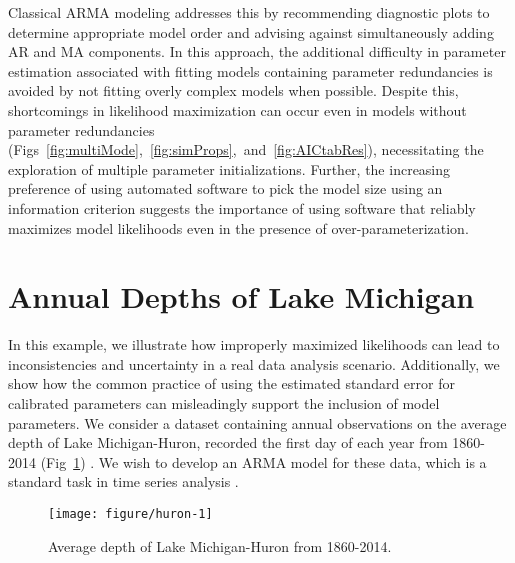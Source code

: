 Classical ARMA modeling addresses this by recommending diagnostic plots to determine appropriate model order and advising against simultaneously adding AR and MA components.
In this approach, the additional difficulty in parameter estimation associated with fitting models containing parameter redundancies is avoided by not fitting overly complex models when possible.
Despite this, shortcomings in likelihood maximization can occur even in models without parameter redundancies (Figs~\ref{fig:multiMode},~\ref{fig:simProps},~and~\ref{fig:AICtabRes}), necessitating the exploration of multiple parameter initializations.
Further, the increasing preference of using automated software to pick the model size using an information criterion suggests the importance of using software that reliably maximizes model likelihoods even in the presence of over-parameterization. 

\section{Annual Depths of Lake Michigan}\label{sec:depths}

\noindent In this example, we illustrate how improperly maximized likelihoods can lead to inconsistencies and uncertainty in a real data analysis scenario.
Additionally, we show how the common practice of using the estimated standard error for calibrated parameters can misleadingly support the inclusion of model parameters.
We consider a dataset containing annual observations on the average depth of Lake Michigan-Huron, recorded the first day of each year from 1860-2014 (Fig~\ref{fig:huron}) \cite{NOAA16}.
We wish to develop an ARMA model for these data, which is a standard task in time series analysis \cite{shumway2017}.

\begin{figure}[!ht]
\begin{knitrout}
\color{fgcolor}

{\centering \texttt{[image: figure/huron-1]} 

}


\end{knitrout}
\caption{\label{fig:huron}
Average depth of Lake Michigan-Huron from 1860-2014.
}
\end{figure}

